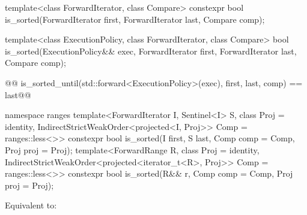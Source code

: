 %
\begin{itemdecl}
template<class ForwardIterator, class Compare>
  constexpr bool is_sorted(ForwardIterator first, ForwardIterator last,
                           Compare comp);
\end{itemdecl}

\begin{itemdescr}
\pnum
\removed{\returns} 
\end{itemdescr}


%
\begin{itemdecl}
template<class ExecutionPolicy, class ForwardIterator, class Compare>
  bool is_sorted(ExecutionPolicy&& exec,
                 ForwardIterator first, ForwardIterator last,
                 Compare comp);
\end{itemdecl}

\begin{itemdescr}
\pnum
\removed{\returns}
\begin{codeblock}
@@ is_sorted_until(std::forward<ExecutionPolicy>(exec), first, last, comp) == last@\added{;}@
\end{codeblock}
\end{itemdescr}

\begin{addedblock}
%
\begin{itemdecl}
namespace ranges {
  template<ForwardIterator I, Sentinel<I> S, class Proj = identity,
      IndirectStrictWeakOrder<projected<I, Proj>> Comp = ranges::less<>>
    constexpr bool is_sorted(I first, S last, Comp comp = Comp{}, Proj proj = Proj{});
  template<ForwardRange R, class Proj = identity,
      IndirectStrictWeakOrder<projected<iterator_t<R>, Proj>> Comp = ranges::less<>>
    constexpr bool is_sorted(R&& r, Comp comp = Comp{}, Proj proj = Proj{});
}
\end{itemdecl}

\begin{itemdescr}
\pnum
\effects Equivalent to: 
\end{itemdescr}
\end{addedblock}

